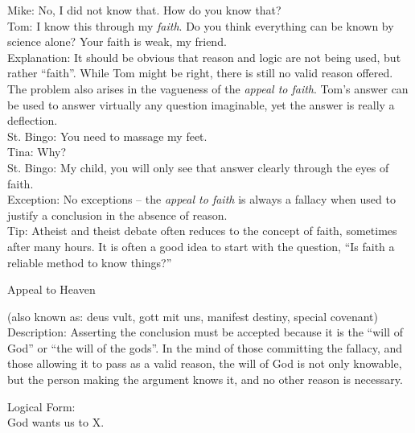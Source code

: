 \documentclass[a4paper,12pt,single,pdftex]{scrbook}
\begin{document}
{    
      Mike: No, I did not know that.  How do you know that?
    \\

    
      Tom: I know this through my {\it faith}.  Do you think everything can be known by science alone?  Your faith is weak, my friend.
    \\

    
      Explanation: It should be obvious that reason and logic are not being used, but rather “faith”.  While Tom might be right, there is still no valid reason offered.  The problem also arises in the vagueness of the {\it appeal to faith}.  Tom’s answer can be used to answer virtually any question imaginable, yet the answer is really a deflection.
    \\

    
      St. Bingo: You need to massage my feet.
    \\

    
      Tina: Why?
    \\

    
      St. Bingo: My child, you will only see that answer clearly through the eyes of faith.
    \\

    
      Exception: No exceptions -- the {\it appeal to faith} is always a fallacy when used to justify a conclusion in the absence of reason.
    \\

    
      Tip: Atheist and theist debate often reduces to the concept of faith, sometimes after many hours. It is often a good idea to start with the question, “Is faith a reliable method to know things?” 
    \\

  }


Appeal to Heaven
    
      (also known as: deus vult, gott mit uns, manifest destiny, special covenant)
    \\

  
    Description: Asserting the conclusion must be accepted because it is the “will of God” or “the will of the gods”.  In the mind of those committing the fallacy, and those allowing it to pass as a valid reason, the will of God is not only knowable, but the person making the argument knows it, and no other reason is necessary.

    
      Logical Form:
    \\

    
      God wants us to X.
    \\
\end{document}
